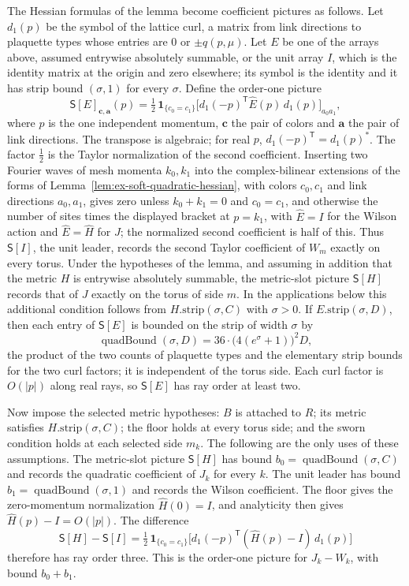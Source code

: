 The Hessian formulas of the lemma become coefficient pictures as
follows. Let $d_1(p)$ be the symbol of the lattice curl, a matrix from
link directions to plaquette types whose entries are $0$ or
$\pm q(p,\mu)$. Let $E$ be one of the arrays above, assumed entrywise
absolutely summable, or the unit array
$I$, which is the identity matrix at the origin and zero elsewhere; its
symbol is the identity and it has strip bound $(\sigma,1)$ for every
$\sigma$. Define the order-one picture
\[
 \mathsf S[E]_{\mathbf c,\mathbf a}(p)
 =\tfrac12\,\mathbf 1_{\{c_0=c_1\}}
  \bigl[d_1(-p)^{\mathsf T}\widehat E(p)\,d_1(p)\bigr]_{a_0a_1},
\]
where $p$ is the one independent momentum, $\mathbf c$ the pair of
colors and $\mathbf a$ the pair of link directions. The transpose is
algebraic; for real $p$, $d_1(-p)^{\mathsf T}=d_1(p)^*$. The factor
$\tfrac12$ is the Taylor normalization of the second coefficient.
Inserting two Fourier waves of mesh momenta $k_0,k_1$ into the
complex-bilinear extensions of the forms of
Lemma~\ref{lem:ex-soft-quadratic-hessian}, with colors $c_0,c_1$ and
link directions $a_0,a_1$, gives zero unless $k_0+k_1=0$ and
$c_0=c_1$, and otherwise the number of sites times the displayed
bracket at $p=k_1$, with $\widehat E=I$ for the Wilson action and
$\widehat E=\widehat H$ for $J$; the normalized second coefficient is
half of this. Thus $\mathsf S[I]$, the unit leader, records the
second Taylor coefficient of $W_m$ exactly on every torus. Under the
hypotheses of the lemma, and assuming in addition that the metric $H$
is entrywise absolutely summable, the metric-slot picture
$\mathsf S[H]$ records that of $J$ exactly on the torus of side $m$.
In the applications below this additional condition follows from
$H.\mathrm{strip}(\sigma,C)$ with $\sigma>0$. If
$E.\mathrm{strip}(\sigma,D)$, then each entry of $\mathsf S[E]$ is
bounded on the strip of width $\sigma$ by
\[
 \operatorname{quadBound}(\sigma,D)
   =36\cdot\bigl(4(e^\sigma+1)\bigr)^2D ,
\]
the product of the two counts of plaquette types and the elementary
strip bounds for the two curl factors; it is independent of the torus
side. Each curl factor is $O(|p|)$ along real rays, so $\mathsf S[E]$
has ray order at least two.

Now impose the selected metric hypotheses: $B$ is attached to $R$; its
metric satisfies $H.\mathrm{strip}(\sigma,C)$; the floor holds at every
torus side; and the sworn condition holds at each selected side $m_k$.
The following are the only uses of these assumptions. The metric-slot
picture $\mathsf S[H]$ has bound
$b_0=\operatorname{quadBound}(\sigma,C)$ and records the quadratic
coefficient of $J_k$ for every $k$. The unit leader has bound
$b_1=\operatorname{quadBound}(\sigma,1)$ and records the Wilson
coefficient. The floor gives the zero-momentum normalization
$\widehat H(0)=I$, and analyticity then gives
$\widehat H(p)-I=O(|p|)$. The difference
\[
 \mathsf S[H]-\mathsf S[I]
  =\tfrac12\,\mathbf 1_{\{c_0=c_1\}}
   \bigl[d_1(-p)^{\mathsf T}(\widehat H(p)-I)\,d_1(p)\bigr]
\]
therefore has ray order three. This is the order-one picture for
$J_k-W_k$, with bound $b_0+b_1$.

